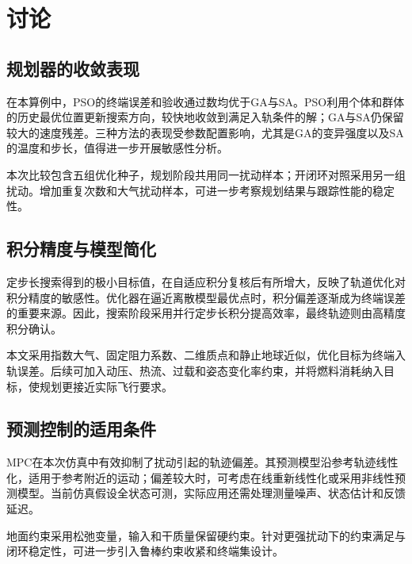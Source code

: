 \section{讨论}
\subsection{规划器的收敛表现}
在本算例中，PSO的终端误差和验收通过数均优于GA与SA。PSO利用个体和群体的历史最优位置更新搜索方向，较快地收敛到满足入轨条件的解；GA与SA仍保留较大的速度残差。三种方法的表现受参数配置影响，尤其是GA的变异强度以及SA的温度和步长，值得进一步开展敏感性分析。

本次比较包含五组优化种子，规划阶段共用同一扰动样本；开闭环对照采用另一组扰动。增加重复次数和大气扰动样本，可进一步考察规划结果与跟踪性能的稳定性。

\subsection{积分精度与模型简化}
定步长搜索得到的极小目标值，在自适应积分复核后有所增大，反映了轨道优化对积分精度的敏感性。优化器在逼近离散模型最优点时，积分偏差逐渐成为终端误差的重要来源。因此，搜索阶段采用并行定步长积分提高效率，最终轨迹则由高精度积分确认。

本文采用指数大气、固定阻力系数、二维质点和静止地球近似，优化目标为终端入轨误差。后续可加入动压、热流、过载和姿态变化率约束，并将燃料消耗纳入目标，使规划更接近实际飞行要求。

\subsection{预测控制的适用条件}
MPC在本次仿真中有效抑制了扰动引起的轨迹偏差。其预测模型沿参考轨迹线性化，适用于参考附近的运动；偏差较大时，可考虑在线重新线性化或采用非线性预测模型。当前仿真假设全状态可测，实际应用还需处理测量噪声、状态估计和反馈延迟。

地面约束采用松弛变量，输入和干质量保留硬约束。针对更强扰动下的约束满足与闭环稳定性，可进一步引入鲁棒约束收紧和终端集设计。
